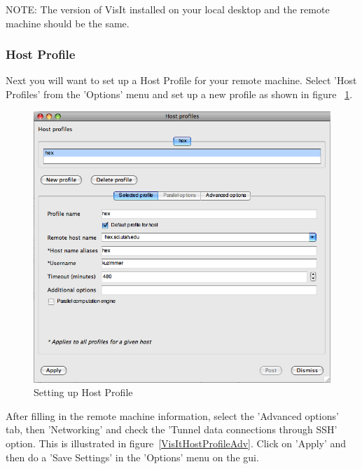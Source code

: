 \documentclass[12pt]{article}
\begin{document}
NOTE: The version of VisIt installed on your local desktop and the
remote machine should be the same.

\subsubsection{Host Profile}
Next you will want to set up a Host Profile for your remote
machine. Select 'Host Profiles' from the 'Options' menu and set up a
new profile as shown in figure ~\ref{VisItHostProfile}.


\begin{figure}

  \begin{center}
  \includegraphics[scale=0.20]{VisItHostProfile.png}
  \end{center}
  \caption{Setting up Host Profile}
  \label{VisItHostProfile}

\end{figure}


After filling in the remote machine information, select the 'Advanced
options' tab, then 'Networking' and check the 'Tunnel data connections
through SSH' option. This is illustrated in
figure~\ref{VisItHostProfileAdv}. Click on 'Apply' and then do a 'Save
Settings' in the 'Options' menu on the gui.
\end{document}
